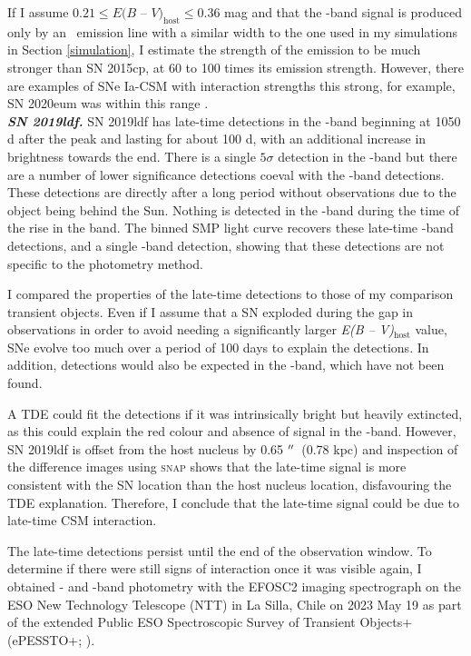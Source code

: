 \documentclass[a4paper,oneside,12pt, class=Latex/Classes/PhDthesisPSnPDF, crop=false]{standalone}
\begin{document}
If I assume $0.21 \leq E(B$ -- $V)_\text{host} \leq 0.36$ mag and that the \ztfr-band signal is produced only by an \Halpha~emission line with a similar width to the one used in my simulations in Section \ref{simulation}, I estimate the strength of the emission to be much stronger than SN 2015cp, at 60 to 100 times its emission strength. However, there are examples of SNe Ia-CSM with interaction strengths this strong, for example, SN 2020eum was within this range \citep{Ia-CSM_BTS}.\\


\textit{\textbf{SN 2019ldf.}}
SN 2019ldf has late-time detections in the \ztfr-band beginning at 1050\,d after the peak and lasting for about 100 d, with an additional increase in brightness towards the end. There is a single $5\sigma$ detection in the \ztfi-band but there are a number of lower significance detections coeval with the \ztfr-band detections. These detections are directly after a long period without observations due to the object being behind the Sun. Nothing is detected in the \ztfg-band during the time of the rise in the \ztfr band. The binned SMP light curve recovers these late-time \ztfr-band detections, and a single \ztfi-band detection, showing that these detections are not specific to the photometry method.

I compared the properties of the late-time detections to those of my comparison transient objects. Even if I assume that a SN exploded during the gap in observations in order to avoid needing a significantly larger \textit{E(B -- V)}$_\text{host}$ value, SNe evolve too much over a period of 100 days to explain the detections. In addition, detections would also be expected in the \ztfg-band, which have not been found. 

A TDE could fit the detections if it was intrinsically bright but heavily extincted, as this could explain the red colour and absence of signal in the \ztfg-band. However, SN 2019ldf is offset from the host nucleus by 0.65 $^{\prime\prime}$~(0.78 kpc) and inspection of the difference images using \textsc{snap} shows that the late-time signal is more consistent with the SN location than the host nucleus location, disfavouring the TDE explanation. Therefore, I conclude that the late-time signal could be due to late-time CSM interaction.

The late-time detections persist until the end of the observation window. To determine if there were still signs of interaction once it was visible again, I obtained \ztfg- and \ztfr-band photometry with the EFOSC2 imaging spectrograph \citep{EFOSC2} on the ESO New Technology Telescope (NTT) in La Silla, Chile on 2023 May 19 as part of the extended Public ESO Spectroscopic Survey of Transient Objects+ (ePESSTO+; \citealt{PESSTO}).
\end{document}
